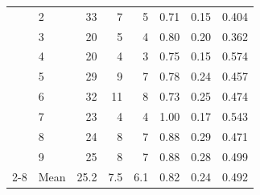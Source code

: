 \begin{tabular}{llrrrccc}
 & 2 & 33 & 7 & 5 & 0.71 & 0.15 & 0.404 \\
 & 3 & 20 & 5 & 4 & 0.80 & 0.20 & 0.362 \\
 & 4 & 20 & 4 & 3 & 0.75 & 0.15 & 0.574 \\
 & 5 & 29 & 9 & 7 & 0.78 & 0.24 & 0.457 \\
 & 6 & 32 & 11 & 8 & 0.73 & 0.25 & 0.474 \\
 & 7 & 23 & 4 & 4 & 1.00 & 0.17 & 0.543 \\
 & 8 & 24 & 8 & 7 & 0.88 & 0.29 & 0.471 \\
 & 9 & 25 & 8 & 7 & 0.88 & 0.28 & 0.499 \\
\cmidrule{2-8}
 & Mean & 25.2 & 7.5 & 6.1 & 0.82 & 0.24 & 0.492 \\
\bottomrule
\end{tabular}
